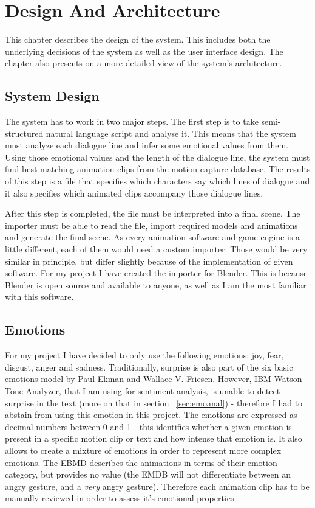 \chapter{Design And Architecture\label{chap:design}}

This chapter describes the design of the system. This includes both the underlying decisions of the system as well as the user interface design. The chapter also presents on a more detailed view of the system's architecture.

\section{System Design}

The system has to work in two major steps. The first step is to take semi-structured natural language script and analyse it. This means that the system must analyze each dialogue line and infer some emotional values from them. Using those emotional values and the length of the dialogue line, the system must find best matching animation clips from the motion capture database. The results of this step is a file that specifies which characters say which lines of dialogue and it also specifies which animated clips accompany those dialogue lines.

After this step is completed, the file must be interpreted into a final scene. The importer must be able to read the file, import required models and animations and generate the final scene. As every animation software and game engine is a little different, each of them would need a custom importer. Those would be very similar in principle, but differ slightly because of the implementation of given software. For my project I have created the importer for Blender. This is because Blender is open source and available to anyone, as well as I am the most familiar with this software.


\section{Emotions}

For my project I have decided to only use the following emotions: joy, fear, disgust, anger and sadness. Traditionally, surprise is also part of the six basic emotions model by Paul Ekman and Wallace V. Friesen. However, IBM Watson Tone Analyzer, that I am using for sentiment analysis, is unable to detect surprise in the text (more on that in section ~\ref{sec:emoanal}) - therefore I had to abstain from using this emotion in this project. The emotions are expressed as decimal numbers between 0 and 1 - this identifies whether a given emotion is present in a specific motion clip or text and how intense that emotion is. It also allows to create a mixture of emotions in order to represent more complex emotions. The EBMD describes the animations in terms of their emotion category, but provides no value (the EMDB will not differentiate between an angry gesture, and a \textit{very} angry gesture). Therefore each animation clip has to be manually reviewed in order to assess it's emotional properties.

